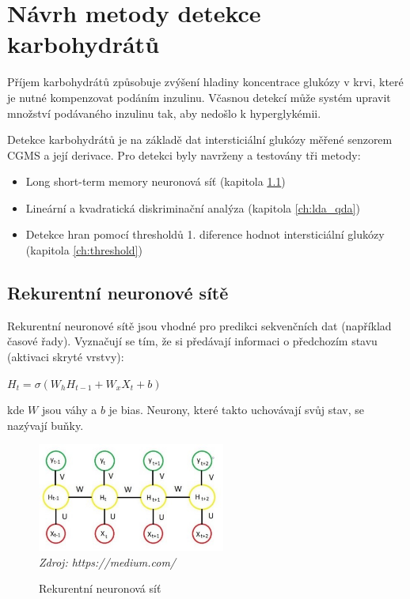 \chapter{Návrh metody detekce karbohydrátů}

Příjem karbohydrátů způsobuje zvýšení hladiny koncentrace glukózy v krvi, které je nutné kompenzovat podáním inzulinu. Včasnou detekcí může systém upravit množství podávaného inzulinu tak, aby nedošlo k hyperglykémii.

Detekce karbohydrátů je na základě dat intersticiální glukózy měřené senzorem CGMS a její derivace. Pro detekci byly navrženy a testovány tři metody:
\begin{itemize}
\setlength\itemsep{0em}
\item Long short-term memory neuronová síť (kapitola \ref{ch:lstm})
\item Lineární a kvadratická diskriminační analýza (kapitola \ref{ch:lda_qda})
\item Detekce hran pomocí thresholdů 1. diference hodnot intersticiální glukózy \\(kapitola \ref{ch:threshold})
\end{itemize}

\section{Rekurentní neuronové sítě}
\label{ch:lstm}

Rekurentní neuronové sítě jsou vhodné pro predikci sekvenčních dat (například časové řady). Vyznačují se tím, že si předávají informaci o předchozím stavu (aktivaci skryté vrstvy):

$H_{t}=\sigma (W_{h}H_{t-1}+W_{x}X_{t}+b)$

\noindent kde $W$ jsou váhy a $b$ je bias. Neurony, které takto uchovávají svůj stav, se nazývají buňky. 

\begin{figure}[H]
\caption{Rekurentní neuronová síť}
\label{fig:rnn}
\centering
\includegraphics[width=0.55\textwidth]{img/cho/rnn.jpeg}\\
\textit{Zdroj: https://medium.com/}
\end{figure}

